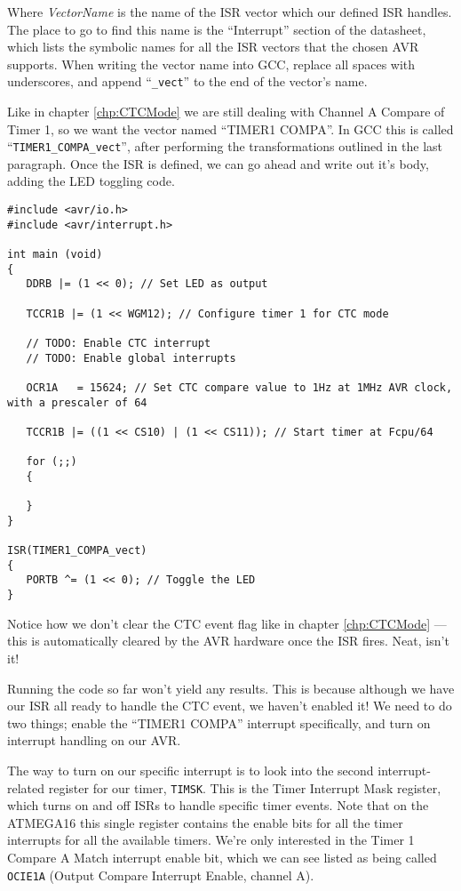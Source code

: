 \documentclass[a4paper,oneside,notitlepage]{book}
\begin{document}
Where \emph{VectorName} is the name of the ISR vector which our defined ISR handles. The place to go to find this name is the ``Interrupt'' section of the datasheet, which lists the symbolic names for all the ISR vectors that the chosen AVR supports. When writing the vector name into GCC, replace all spaces with underscores, and append ``\texttt{\_vect}'' to the end of the vector's name.

Like in chapter \ref{chp:CTCMode} we are still dealing with Channel A Compare of Timer 1, so we want the vector named ``TIMER1 COMPA''. In GCC this is called ``\texttt{TIMER1\_COMPA\_vect}'', after performing the transformations outlined in the last paragraph. Once the ISR is defined, we can go ahead and write out it's body, adding the LED toggling code.

\begin{center}
\begin{lstlisting}
#include <avr/io.h>
#include <avr/interrupt.h>

int main (void)
{
   DDRB |= (1 << 0); // Set LED as output

   TCCR1B |= (1 << WGM12); // Configure timer 1 for CTC mode

   // TODO: Enable CTC interrupt
   // TODO: Enable global interrupts

   OCR1A   = 15624; // Set CTC compare value to 1Hz at 1MHz AVR clock, with a prescaler of 64

   TCCR1B |= ((1 << CS10) | (1 << CS11)); // Start timer at Fcpu/64

   for (;;)
   {

   }
}

ISR(TIMER1_COMPA_vect)
{
   PORTB ^= (1 << 0); // Toggle the LED
} 
\end{lstlisting}
\end{center}

Notice how we don't clear the CTC event flag like in chapter \ref{chp:CTCMode} --- this is automatically cleared by the AVR hardware once the ISR fires. Neat, isn't it!

Running the code so far won't yield any results. This is because although we have our ISR all ready to handle the CTC event, we haven't enabled it! We need to do two things; enable the ``TIMER1 COMPA'' interrupt specifically, and turn on interrupt handling on our AVR.

The way to turn on our specific interrupt is to look into the second interrupt-related register for our timer, \texttt{TIMSK}. This is the Timer Interrupt Mask register, which turns on and off ISRs to handle specific timer events. Note that on the ATMEGA16 this single register contains the enable bits for all the timer interrupts for all the available timers. We're only interested in the Timer 1 Compare A Match interrupt enable bit, which we can see listed as being called \texttt{OCIE1A} (Output Compare Interrupt Enable, channel A).
\end{document}
